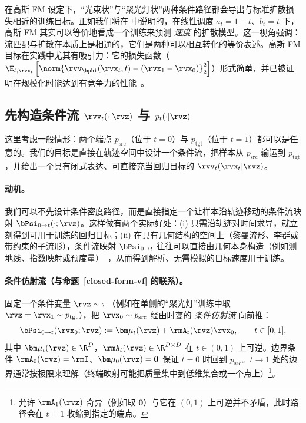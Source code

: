 在高斯 FM 设定下，“光束状”与“聚光灯状”两种条件路径都会导出与标准扩散损失相近的训练目标。正如我们将在  中说明的，在线性调度 $a_t = 1-t$、$b_t = t$ 下，高斯 FM 其实可以等价地看成一个训练来预测 \emph{速度} 的扩散模型。这一视角强调：流匹配与扩散在本质上是相通的，它们是两种可以相互转化的等价表述。高斯 FM 目标在实践中尤其有吸引力：它的损失函数（$\E_{t,\rvx_t} \left[\norm{\rvv_\bphi(\rvx_t, t) - (\rvx_1 - \rvx_0)}_2^2\right]$）形式简单，并已被证明在规模化时能达到有竞争力的性能~\citep{esser2024scaling}。


\subsection{先构造条件流 $\rvv_t(\cdot|\rvz)$ 与 $p_t(\cdot|\rvz)$}\label{subsec:prob-path-flow}

这里考虑一般情形：两个端点 $p_{\mathrm{src}}$（位于 $t=0$）与 $p_{\mathrm{tgt}}$（位于 $t=1$）都可以是任意的。我们的目标是直接在轨迹空间中设计一个条件流，把样本从 $p_{\mathrm{src}}$ 输运到 $p_{\mathrm{tgt}}$，并给出一个具有闭式表达、可直接充当回归目标的 $\rvv_t(\rvx_t|\rvz)$。

\paragraph{动机。}
我们可以不先设计条件密度路径，而是直接指定一个让样本沿轨迹移动的条件流映射 $\bPsi_{0\to t}(\cdot;\rvz)$。这样做有两个实际好处：(i) 只需沿轨迹对时间求导，就立刻得到可用于训练的回归目标；(ii) 在具有几何结构的空间上（黎曼流形、李群或带约束的子流形），条件流映射 $\bPsi_{0\to t}$ 往往可以直接由几何本身构造（例如测地线、指数映射或预度量）~\citep{lipman2024flow}，从而得到解析、无需模拟的目标速度用于训练。


\paragraph{条件仿射流（与命题~\ref{closed-form-vf} 的联系）。}
固定一个条件变量 $\rvz\sim\pi$（例如在单侧的“聚光灯”训练中取 $\rvz=\rvx_1\sim p_{\mathrm{tgt}}$），把 $\rvx_0\sim p_{\mathrm{src}}$ 经由时变的 \emph{条件仿射流} 向前推：
\[
\bPsi_{0\to t}(\rvx_0;\rvz) := \bm\mu_t(\rvz) + \rmA_t(\rvz) \rvx_0,\qquad t\in[0,1],
\]
其中 $\bm\mu_t(\rvz)\in\R^D$，$\rmA_t(\rvz)\in\R^{D\times D}$ 在 $t\in(0,1)$ 上可逆。边界条件 $\rmA_0(\rvz)=\rmI$、$\bm\mu_0(\rvz)=\mathbf 0$ 保证 $t=0$ 时回到 $p_{\mathrm{src}}$。$t\to1$ 处的边界通常按极限来理解（终端映射可能把质量集中到低维集合或一个点上）\footnote{允许 $\rmA_1(\rvz)$ 奇异（例如取 $\mathbf 0$）与它在 $(0,1)$ 上可逆并不矛盾，此时路径会在 $t=1$ 收缩到指定的端点。}。


